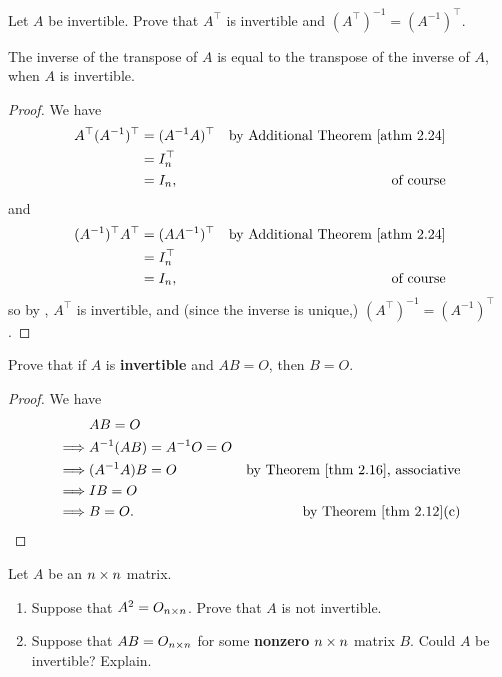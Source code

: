 \begin{exercise} \label{exercise 2.4.5}
Let \(A\) be invertible.
Prove that \(A^\top\) is invertible and \((A^\top)^{-1} = (A^{-1})^\top\).
\end{exercise}

\begin{note}
The inverse of the transpose of \(A\) is equal to the transpose of the inverse of \(A\), when \(A\) is invertible.
\end{note}

\begin{proof}
We have
\begin{align*}
    A^\top (A^{-1})^\top & = ( A^{-1} A )^\top & \text{by \ATHM{2.24}} \\
                       & = I_n^\top \\
                       & = I_n, & \text{of course}
\end{align*}
and
\begin{align*}
    (A^{-1})^\top A^\top  & = ( A A^{-1} )^\top & \text{by \ATHM{2.24}} \\
                       & = I_n^\top \\
                       & = I_n, & \text{of course}
\end{align*}
so by , \(A^\top\) is invertible, and (since the inverse is unique,) \((A^\top)^{-1} = (A^{-1})^\top\).
\end{proof}

\begin{exercise} \label{exercise 2.4.6}
Prove that if \(A\) is \textbf{invertible} and \(AB = O\), then \(B = O\).
\end{exercise}

\begin{proof}
We have
\begin{align*}
             & AB = O \\
    \implies & A^{-1}(AB) = A^{-1} O = O \\
    \implies & (A^{-1} A)B = O & \text{by \THM{2.16}, associative} \\
    \implies & IB = O \\
    \implies & B = O. & \text{by \THM{2.12}(c)}
\end{align*}
\end{proof}

\begin{exercise} \label{exercise 2.4.7}
Let \(A\) be an \(n \times n\) matrix.
\begin{enumerate}
\item Suppose that \(A^2 = O_{n \times n}\).
    Prove that \(A\) is not invertible.
\item Suppose that \(AB = O_{n \times n}\) for some \textbf{nonzero} \(n \times n\) matrix \(B\).
    Could \(A\) be invertible? Explain.
\end{enumerate}
\end{exercise}

